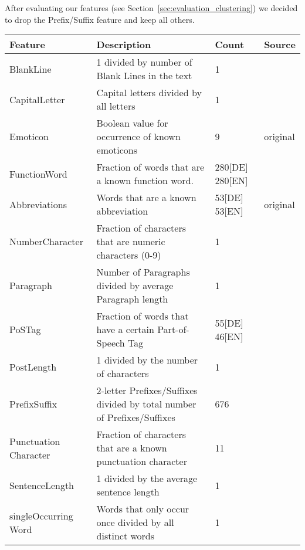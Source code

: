 After evaluating our features (see Section~\ref{sec:evaluation_clustering}) we decided to drop the Prefix/Suffix feature and keep all others.

\begin{table}[h]
    \begin{center}
    \begin{tabular}{p{2.6cm}|p{6cm}|p{1.2cm}|p{1.2cm}}
    Feature					& Description																& Count				& Source\\ \hline \hline
    BlankLine				& 1 divided by number of Blank Lines in the text							& 1					& \cite{de2001mining}\\ \hline
    CapitalLetter			& Capital letters divided by all letters									& 1					& \cite{argamon2003style} \cite{de2001mining}\\ \hline
    Emoticon				& Boolean value for occurrence of known emoticons							& 9					& original\\ \hline
    FunctionWord			& Fraction of words that are a known function word.							& 280[DE] 280[EN]	& \cite{argamon2003style} \cite{de2001mining} \cite{madigan2005author} \cite{narayanan2012feasibility}\\ \hline
    Abbreviations			& Words that are a known abbreviation										& 53[DE] 53[EN]		& original\\ \hline
    NumberCharacter			& Fraction of characters that are numeric characters (0-9)					& 1					& \cite{narayanan2012feasibility}\\ \hline
    Paragraph				& Number of Paragraphs divided by average Paragraph	length					& 1					& \cite{argamon2003style}\\ \hline
    PoSTag					& Fraction of words that have a certain Part-of-Speech Tag                  & 55[DE] 46[EN]  	& \cite{madigan2005author}\\ \hline
    PostLength				& 1 divided by the number of characters										& 1					& \cite{narayanan2012feasibility}\\ \hline
    PrefixSuffix			& 2-letter Prefixes/Suffixes divided by total number of Prefixes/Suffixes	& 676 			 	& \cite{madigan2005author}\\ \hline
    Punctuation Character	& Fraction of characters that are a known punctuation character				& 11				& \cite{madigan2005author} \cite{narayanan2012feasibility}\\ \hline
    SentenceLength			& 1 divided by the average sentence length									& 1 				& \cite{de2001mining}\\ \hline
    singleOccurring Word	& Words that only occur once divided by all distinct words					& 1					& \cite{madigan2005author} \cite{narayanan2012feasibility}\\ \hline

\end{tabular}
\end{center}
\end{table}
